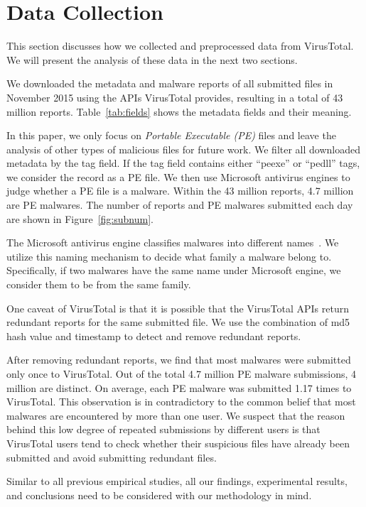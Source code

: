 

\section{Data Collection}
\label{sec:meth}

This section discusses how we collected and preprocessed data from VirusTotal.
We will present the analysis of these data in the next two sections.

We downloaded the metadata and malware reports of all submitted files in November 2015 using the APIs VirusTotal provides,
resulting in a total of 43 million reports.
Table~\ref{tab:fields} shows the metadata fields and their meaning. 

In this paper, we only focus on {\em Portable Executable (PE)} files 
and leave the analysis of other types of malicious files for future work. 
We filter all downloaded metadata by the tag field. 
If the tag field contains either ``peexe'' or ``pedll'' tags, we consider the record as a PE file. 
We then use Microsoft antivirus engines to judge whether a PE file is a malware.
Within the 43 million reports, 4.7 million are PE malwares. 
The number of reports and PE malwares submitted each day are shown in Figure~\ref{fig:subnum}.

The Microsoft antivirus engine classifies malwares into different names~\cite{microsoft}. 
We utilize this naming mechanism to decide what family a malware belong to.
Specifically, if two malwares have the same name under Microsoft engine, we consider them to be from the same family.

One caveat of VirusTotal is that it is possible that the VirusTotal APIs return redundant reports 
for the same submitted file. 
We use the combination of md5 hash value and timestamp to detect and remove redundant reports.

After removing redundant reports, we find that most malwares were submitted only once to VirusTotal. 
Out of the total 4.7 million PE malware submissions, 4 million are distinct. 
On average, each PE malware was submitted 1.17 times to VirusTotal. 
This observation is in contradictory to the common belief that most malwares are encountered by more than one user.
We suspect that the reason behind this low degree of repeated submissions by different users
is that VirusTotal users
tend to check whether their suspicious files have already been submitted
and avoid submitting redundant files.

Similar to all previous empirical studies, all our findings, experimental results, 
and conclusions need to be considered with our methodology in mind. 

